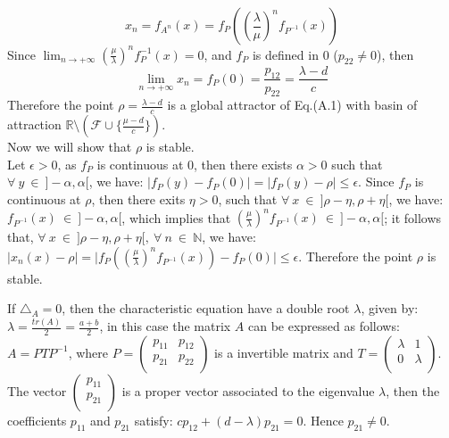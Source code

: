 \documentclass[11pt]{amsart}
\theoremstyle{definition}
\theoremstyle{remark}
\theoremstyle{example}
\numberwithin{equation}{section}
\begin{document}
\begin{description}[leftmargin=*]
$$x_n=f_{A^n}(x)=f_P\left(\left(\frac{\lambda}{\mu}\right)^n f_{P^{-1}}(x)\right)$$
\noindent
Since $\displaystyle{\lim_{n\rightarrow+\infty}(\frac{\mu}{\lambda})^nf_P^{-1}(x)=0}$, and $f_P$ is defined in $0$ ($p_{22}\neq0$), then
$$\lim_{n\rightarrow+\infty}x_n=f_P(0)=\frac{p_{12}}{p_{22}}=\frac{\lambda-d}{c}$$
\noindent
Therefore the point $\rho=\frac{\lambda-d}{c}$ is a global attractor of Eq.(A.1) with basin
of attraction $\mathbb{R}\setminus(\mathcal{F}\cup\{\frac{\mu-d}{c}\})$.\\
Now we will show that $\rho$ is stable.\\
\noindent
Let $\epsilon>0$, as $f_P$ is continuous at $0$, then there exists $\alpha>0$
such that $\forall \ y \ \in \ ]-\alpha, \alpha[$, we have:  $|f_P(y)-f_P(0)|=|f_P(y)-\rho|\leq\epsilon$. Since $f_P$
is continuous at $\rho$, then there exits $\eta>0$, such that $\forall \ x \ \in \ ]\rho-\eta, \rho+\eta[$, we have:
$f_{P^{-1}}(x) \ \in \ ]-\alpha,\alpha[$, which implies that
$(\frac{\mu}{\lambda})^nf_{P^{-1}}(x) \ \in \ ]-\alpha,\alpha[$; it follows that,
$\forall \ x \ \in \ ]\rho-\eta, \rho+\eta[, \ \forall \ n \ \in \ \mathbb{N}$, we have:
\\ $\mid x_n(x)-\rho\mid=\mid f_P((\frac{\mu}{\lambda})^nf_{P^{-1}}(x))-f_P(0)\mid\leq\epsilon$.
Therefore the point $\rho$ is stable.
\\
\item[(2)-(ii)] If $\triangle_A=0$, then the characteristic equation have a double root $\lambda$, given by:
$ \lambda=\frac{tr(A)}{2}=\frac{a+b}{2}$, in this case the matrix $A$ can be expressed as follows: $A=PTP^{-1}$, where
 $P=\left(\begin{array}{cc}
p_{11} & p_{12}\\
p_{21} & p_{22} \\
\end{array} \right)$ is a invertible matrix and
$T=\left(\begin{array}{cc}
\lambda & 1 \\
0 & \lambda \\
\end{array} \right)$.
The vector
$\left(\begin{array}{c}
p_{11} \\
p_{21} \\\end{array}\right)$ is a proper vector associated to the eigenvalue $\lambda$, then the coefficients $p_{11}$
and $p_{21}$ satisfy: $cp_{12}+(d-\lambda)p_{21}=0$. Hence $p_{21}\neq0$. \\

\end{description}
\end{document}

